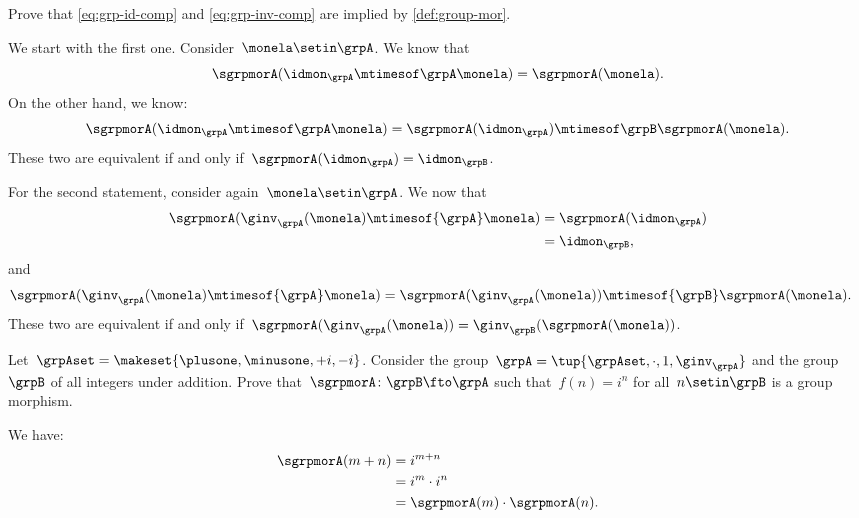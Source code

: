 \begin{exercise}
    Prove that \cref{eq:grp-id-comp} and \cref{eq:grp-inv-comp} are implied by \cref{def:group-mor}.
\end{exercise}
\begin{solution}
    We start with the first one.
    Consider~$\monela \setin \grpA$.
    We know that
    \begin{equation}
        \sgrpmorA(\idmon_\grpA \mtimesof\grpA \monela)=\sgrpmorA(\monela).
    \end{equation}
    On the other hand, we know:
    \begin{equation}
        \sgrpmorA(\idmon_\grpA \mtimesof\grpA \monela) = \sgrpmorA(\idmon_\grpA)\mtimesof\grpB \sgrpmorA(\monela).
    \end{equation}
    These two are equivalent if and only if~$\sgrpmorA(\idmon_\grpA)=\idmon_\grpB$.

    For the second statement, consider again~$\monela \setin \grpA$.
    We now that
    \begin{equation}
        \begin{aligned}
            \sgrpmorA(\ginv_{\grpA}(\monela)\mtimesof{\grpA} \monela) & =\sgrpmorA(\idmon_\grpA) \\
                                                                      & =\idmon_\grpB,
        \end{aligned}
    \end{equation}
    and
    \begin{equation}
        \begin{aligned}
            \sgrpmorA(\ginv_{\grpA}(\monela)\mtimesof{\grpA} \monela) & =\sgrpmorA(\ginv_{\grpA}(\monela))\mtimesof{\grpB} \sgrpmorA(\monela).
        \end{aligned}
    \end{equation}
    These two are equivalent if and only if~$\sgrpmorA(\ginv_{\grpA}(\monela))=\ginv_{\grpB}(\sgrpmorA(\monela))$.

\end{solution}

\begin{exercise}
    Let~$\grpAset=\makeset{\plusone,\minusone,+i,-i}$.
    Consider the group~$\grpA=\tup{\grpAset, \cdot, 1, \ginv_\grpA}$ and the group~$\grpB$ of all integers under addition.
    Prove that~$\sgrpmorA\colon \grpB \fto \grpA$ such that~$f(n)=i^n$ for all~$n\setin \grpB$ is a group morphism.
\end{exercise}
\begin{solution}
    We have:
    \begin{equation}
        \begin{aligned}
            \sgrpmorA(m+n) & =i^{m+n} \\
                           & =i^m \cdot i^n \\
                           & =\sgrpmorA(m)\cdot \sgrpmorA(n).
        \end{aligned}
    \end{equation}
\end{solution}

